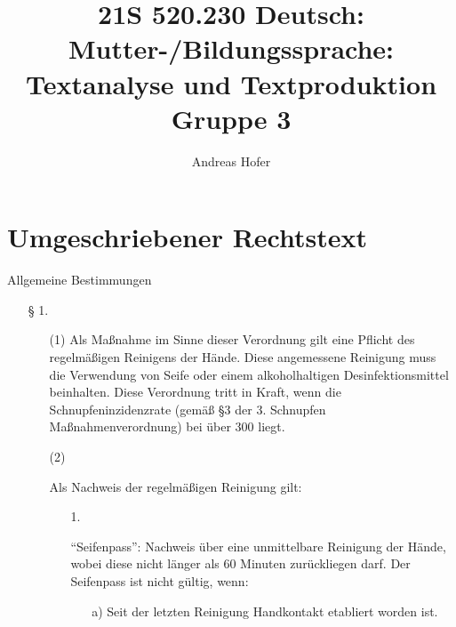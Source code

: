 \documentclass{article}
\title{\vspace{-3cm}21S 520.230 Deutsch: Mutter-/Bildungssprache: Textanalyse und Textproduktion Gruppe 3}
\author{Andreas Hofer}
\begin{document}
\section*{Umgeschriebener Rechtstext}
	Allgemeine Bestimmungen
	\begin{itemize}
		\item[§ 1.]{}
		\item[{}]{
			\begin{itemize}
				\item[(1)]{Als Maßnahme im Sinne dieser Verordnung gilt eine Pflicht des regelmäßigen Reinigens der Hände. Diese angemessene Reinigung muss die Verwendung von Seife oder einem alkoholhaltigen Desinfektionsmittel beinhalten. Diese Verordnung tritt in Kraft, wenn die Schnupfeninzidenzrate (gemäß §3 der 3. Schnupfen Maßnahmenverordnung) bei über 300 liegt.}
				\item[(2)]{Als Nachweis der regelmäßigen Reinigung gilt:
					\begin{itemize}
						\item[1.]{“Seifenpass”: Nachweis über eine unmittelbare Reinigung der Hände, wobei diese nicht länger als 60 Minuten zurückliegen darf. Der Seifenpass ist nicht gültig, wenn:
							\begin{itemize}
								\item[a)]{Seit der letzten Reinigung Handkontakt etabliert worden ist.}
							\end{itemize}}
					\end{itemize}}
			\end{itemize}}
	\end{itemize}
\end{document}
